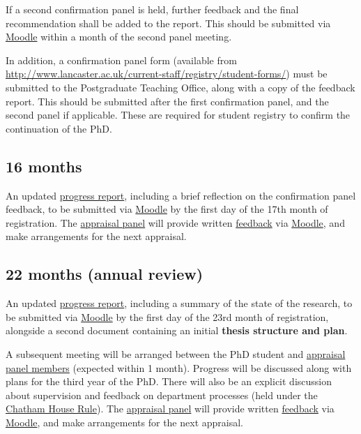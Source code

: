 \documentclass[12pt,a4paper]{article}
\begin{document}
If a second confirmation panel is held, further feedback and the final recommendation shall be added to the report. This should be submitted via \href{https://modules.lancaster.ac.uk/course/view.php?id=7050}{Moodle} within a month of the second panel meeting.

In addition, a confirmation panel form (available from \url{http://www.lancaster.ac.uk/current-staff/registry/student-forms/}) must be submitted to the Postgraduate Teaching Office, along with a copy of the feedback report. This should be submitted after the first confirmation panel, and the second panel if applicable. These are required for student registry to confirm the continuation of the PhD.


\subsection{16 months} \label{sec:16months}
An updated \hyperref[sec:report]{progress report}, including a brief reflection on the confirmation panel feedback, to be submitted via \href{https://modules.lancaster.ac.uk/course/view.php?id=7050}{Moodle} by the first day of the 17th month of registration. The \hyperref[sec:panel]{appraisal panel} will provide written \hyperref[sec:feedback]{feedback} via \href{https://modules.lancaster.ac.uk/course/view.php?id=7050}{Moodle}, and make arrangements for the next appraisal.


\subsection{22 months (annual review)} \label{sec:22months}
An updated \hyperref[sec:report]{progress report}, including a summary of the state of the research, to be submitted via \href{https://modules.lancaster.ac.uk/course/view.php?id=7050}{Moodle} by the first day of the 23rd month of registration, alongside a second document containing an initial \textbf{thesis structure and plan}.

A subsequent meeting will be arranged between the PhD student and \hyperref[sec:panel]{appraisal panel members} (expected within 1 month). Progress will be discussed along with plans for the third year of the PhD. There will also be an explicit discussion about supervision and feedback on department processes (held under the \href{https://www.chathamhouse.org/chatham-house-rule}{Chatham House Rule}). The \hyperref[sec:panel]{appraisal panel} will provide written \hyperref[sec:feedback]{feedback} via \href{https://modules.lancaster.ac.uk/course/view.php?id=7050}{Moodle}, and make arrangements for the next appraisal.
\end{document}
